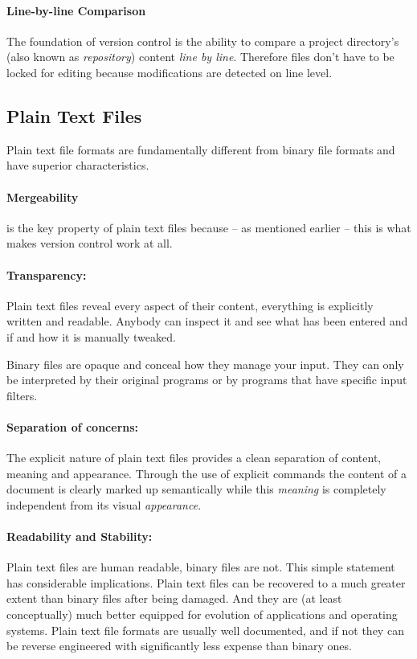 \documentclass[11pt,a4paper]{article}
\begin{document}
\paragraph{Line-by-line Comparison}
The foundation of version control is the ability to compare a project directory's (also
known as \emph{repository}) content \emph{line by line}. Therefore files don't have to be locked for editing because modifications are detected on line level.

\subsection{Plain Text Files}
Plain text file formats are fundamentally different from binary file formats and have superior characteristics.

\paragraph{Mergeability}
is the key property of plain text files because -- as mentioned earlier -- this is what
makes version control work at all.

\paragraph{Transparency:}
Plain text files reveal every aspect of their content, everything is explicitly written
and readable. Anybody can inspect it and see what has been entered and if and how it is
manually tweaked. 

Binary files are opaque and conceal how they manage your input. They can only be
interpreted by their original programs or by programs that have specific input filters.

\paragraph{Separation of concerns:}
The explicit nature of plain text files provides a clean separation of content, meaning
and appearance. Through the use of explicit commands the content
of a document is clearly marked up semantically while this \emph{meaning} is completely
independent from its visual \emph{appearance}.

\paragraph{Readability and Stability:}
Plain text files are human readable, binary files are not. This simple statement has
considerable implications. Plain text files can be recovered to a much greater extent
than binary files after being damaged. And they are (at least conceptually) much better
equipped for evolution of applications and operating systems. Plain text file formats are
usually well documented, and if not they can be reverse engineered with significantly
less expense than binary ones.
\end{document}
